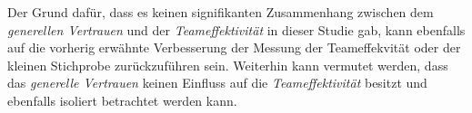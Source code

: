 \documentclass[a4paper,11pt]{article}%
\renewcommand{\\}{\vspace*{0.5\baselineskip} \newline}
\begin{document}
{{%
Der Grund dafür, dass es keinen signifikanten Zusammenhang zwischen dem \textit{generellen Vertrauen} und der \textit{Teameffektivität} in dieser Studie gab, kann ebenfalls auf die vorherig erwähnte Verbesserung der Messung der Teameffekvität oder der kleinen Stichprobe zurückzuführen sein. Weiterhin kann vermutet werden, dass das \textit{generelle Vertrauen} keinen Einfluss auf die \textit{Teameffektivität} besitzt und ebenfalls isoliert betrachtet werden kann.





%
	
}}
\end{document}
